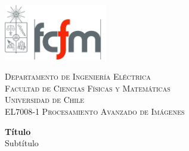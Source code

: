 \documentclass[letterpaper,11pt]{article}
\begin{document}
	\noindent
	\begin{minipage}{0.3\textwidth}
		\includegraphics[width=4.5cm]{images/logo.png} 
	\end{minipage}
	\begin{minipage}{0.65\textwidth}
		\vspace{0.6cm}  %
		\raggedright
		\textsc{\color{red}Departamento de Ingeniería Eléctrica}\\
		\textsc{\color{gray51}Facultad de Ciencias Físicas y Matemáticas}\\
		\textsc{\color{gray51}Universidad de Chile}\\
		\textsc{\color{gray51}EL7008-1 Procesamiento Avanzado de Imágenes}
	\end{minipage}
	
	\vspace{0cm}  %
	
	\begin{center}
		{\LARGE \textbf{Título}}\\
		{\Large Subtítulo}
	\end{center}
	
	
	\printbibliography
	
\end{document}
